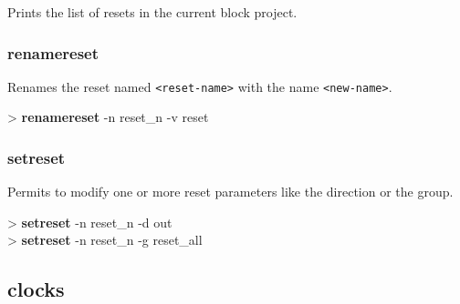\documentclass[10pt,a4paper]{article}
\begin{document}
Prints the list of resets in the current block project.

\subsubsection{renamereset}
\label{subsec:renamereset}

Renames the reset named \texttt{<reset-name>} with the name \texttt{<new-name>}.\\


\begin{sampletitle}
> \textbf{\tool{} renamereset} -n reset\_n -v reset
\end{sampletitle}


\subsubsection{setreset}
\label{subsec:setreset}

Permits to modify one or more reset parameters like the direction or the group.\\


\begin{sampletitle}
> \textbf{\tool{} setreset} -n reset\_n -d out \\
> \textbf{\tool{} setreset} -n reset\_n -g reset\_all
\end{sampletitle}

\subsection{clocks}
\end{document}
